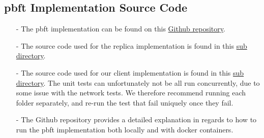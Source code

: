 \documentclass[12pt, a4paper]{report}
\numberwithin{figure}{section}
\numberwithin{table}{section}
\begin{document}
	
	
	
	
		
	
		
	
		
	
		
	
		
	
	
	
\listoffigures
\lstlistoflistings

\newpage
\begin{appendices}
	\chapter{\ac{pbft} Implementation Source Code}
	\begin{itemize}
		\item[-] The \ac{pbft} implementation can be found on this \href{https://github.com/Lupu2/PBFT-Master}{Github repository}.
		\item[-] The source code used for the replica implementation is found in this \href{https://github.com/Lupu2/PBFT-Master/tree/main/PBFT}{sub directory}.
		\item[-] The source code used for our client implementation is found in this \href{https://github.com/Lupu2/PBFT-Master/tree/main/PBFTClient}{sub directory}. The unit tests can unfortunately not be all run concurrently, due to some issue with the network tests. We therefore recommend running each folder separately, and re-run the test that fail uniquely once they fail. 
		\item[-] The Github repository provides a detailed explanation in regards to how to run the \ac{pbft} implementation both locally and with docker containers. 
	\end{itemize} 
\end{appendices}
\printbibliography[heading=bibintoc]
\end{document}
